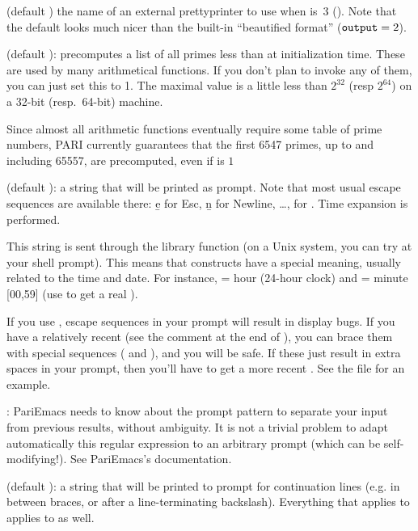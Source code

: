  (default ) the name of an external prettyprinter to use when
 is~3 (). Note that the default
 looks much nicer than the built-in ``beautified
format'' (${\tt output} = 2$).

 (default ):  precomputes a list of
all primes less than  at initialization time. These are used
by many arithmetical functions. If you don't plan to invoke any of them, you
can just set this to 1. The maximal value is a little less than $2^32$
(resp $2^64$) on a 32-bit (resp.~64-bit) machine.

Since almost all arithmetic functions eventually require some table of prime
numbers, PARI currently guarantees that the first 6547 primes, up to and
including 65557, are precomputed, even if  is $1$

 (default ): a string that will be printed as
prompt. Note that most usual escape sequences are available there: \b{e} for
Esc, \b{n} for Newline, \dots, \kbd{\bs\bs} for \kbd{\bs}. Time expansion is
performed.

This string is sent through the library function  (on a
Unix system, you can try  at your shell prompt). This means
that \kbd{\%} constructs have a special meaning, usually related to the time
and date. For instance,  = hour (24-hour clock) and  =
minute [00,59] (use \kbd{\%\%} to get a real \kbd{\%}).

If you use , escape sequences in your prompt will result in
display bugs. If you have a relatively recent  (see the comment
at the end of ), you can brace them with special sequences
(\kbd{\bs[} and \kbd{\bs]}), and you will be safe. If these just result in
extra spaces in your prompt, then you'll have to get a more recent
. See the file  for an example.

: PariEmacs needs to know about the prompt pattern to
separate your input from previous  results, without ambiguity. It is
not a trivial problem to adapt automatically this regular expression to an
arbitrary prompt (which can be self-modifying!). See PariEmacs's
documentation.

 (default ): a string that will be printed
to prompt for continuation lines (e.g. in between braces, or after a
line-terminating backslash). Everything that applies to 
applies to  as well.

